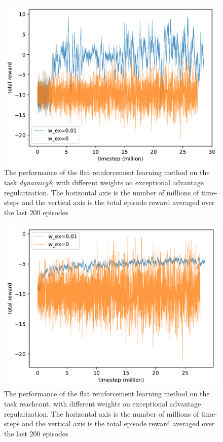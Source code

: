 \begin{figure}[!htbp]
	\includegraphics[width=\textwidth]{images/rec_180719_baseline_dynamicg8.pdf}
	\centering
	\caption{The performance of the flat reinforcement learning method on the task \textit{dynamicg8}, with different weights on exceptional advantage regularization. The horizontal axis is the number of millions of time-steps and the vertical axis is the total episode reward averaged over the last 200 episodes}\label{rec_basline_dynamicg8}
\end{figure}

\begin{figure}[!htbp]
	\includegraphics[width=\textwidth]{images/rec_180718_basiline_reachcont.pdf}
	\centering
	\caption{The performance of the flat reinforcement learning method on the task reachcont, with different weights on exceptional advantage regularization. The horizontal axis is the number of millions of time-steps and the vertical axis is the total episode reward averaged over the last 200 episodes}\label{rec_basline_reachcont}
\end{figure}


